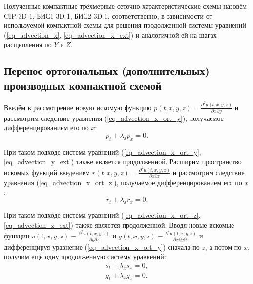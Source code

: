 \documentclass[11pt]{article}
\begin{document}
Полученные компактные трёхмерные сеточно-характеристические схемы назовём CIP-3D-1, БИС1-3D-1, БИС2-3D-1, соответственно, в зависимости от используемой компактной схемы для решения продолженной системы уравнений (\ref{eq_advection_x}, \ref{eq_advection_x_ext}) и аналогичной ей на шагах расщепления по $Y$ и $Z$.

\subsection{Перенос ортогональных (дополнительных) производных компактной схемой}

Введём в рассмотрение новую искомую функцию $p(t, x, y, z) = \frac{\partial^2 u(t, x, y, z)}{\partial x \partial y}$ и рассмотрим следствие уравнения (\ref{eq_advection_x_ort_y}), получаемое дифференцированием его по $x$:
\begin{equation}
\label{eq_advection_y_ext}
p_t + \lambda_x p_x = 0.
\end{equation}

При таком подходе система уравнений (\ref{eq_advection_x_ort_y}, \ref{eq_advection_y_ext}) также является продолженной.
Расширим пространство искомых функций введением $r(t, x, y, z) = \frac{\partial^2 u(t, x, y, z)}{\partial  x \partial z}$ и рассмотрим следствие уравнения (\ref{eq_advection_x_ort_z}), получаемое дифференцированием его по $x$:
\begin{equation}
\label{eq_advection_z_ext}
r_t + \lambda_x r_x = 0.
\end{equation}

При таком подходе система уравнений (\ref{eq_advection_x_ort_z}, \ref{eq_advection_z_ext}) также является продолженной.
Вводя новые искомые функции $s(t, x, y, z) = \frac{\partial^2 u(t, x, y, z)}{\partial y \partial z}$ и $g(t, x, y, z) = \frac{\partial^3 u(t, x, y, z)}{\partial x \partial y \partial z}$ и дифференцируя уравнение (\ref{eq_advection_x_ort_y}) сначала по $z$, а потом по $x$, получим ещё одну продолженную систему уравнений:
\begin{eqnarray}
\label{eq_advection_x_add_yz}
s_t + \lambda_x s_x = 0, \\
\label{eq_advection_x_add_xyz}
g_t + \lambda_x g_x = 0.
\end{eqnarray}
\end{document}
